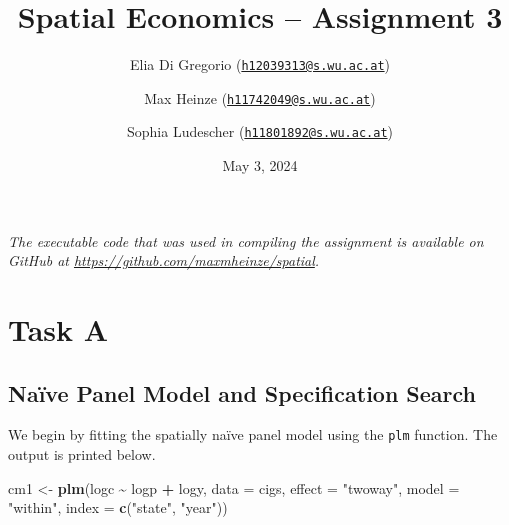 \documentclass[
  a4paper,
]{article}
\title{\textbf{Spatial Economics -- Assignment 3}}
\author{Elia Di Gregorio
(\href{mailto:h12039313@s.wu.ac.at}{\nolinkurl{h12039313@s.wu.ac.at}}) \and Max
Heinze
(\href{mailto:h11742049@s.wu.ac.at}{\nolinkurl{h11742049@s.wu.ac.at}}) \and Sophia
Ludescher
(\href{mailto:h11801892@s.wu.ac.at}{\nolinkurl{h11801892@s.wu.ac.at}})}
\date{May 3, 2024}
\newenvironment{Shaded}{\begin{snugshade}}{\end{snugshade}}
\newcommand{\AttributeTok}[1]{\textcolor[rgb]{0.13,0.29,0.53}{#1}}
\newcommand{\FunctionTok}[1]{\textcolor[rgb]{0.13,0.29,0.53}{\textbf{#1}}}
\newcommand{\NormalTok}[1]{#1}
\newcommand{\OtherTok}[1]{\textcolor[rgb]{0.56,0.35,0.01}{#1}}
\newcommand{\SpecialCharTok}[1]{\textcolor[rgb]{0.81,0.36,0.00}{\textbf{#1}}}
\newcommand{\StringTok}[1]{\textcolor[rgb]{0.31,0.60,0.02}{#1}}
\begin{document}
\maketitle

{
\hypersetup{linkcolor=}
\setcounter{tocdepth}{2}
\tableofcontents
}
\vspace{2em}

\begin{tcolorbox}
\centering \itshape The executable code that was used in compiling the assignment is available on GitHub at \url{https://github.com/maxmheinze/spatial}.
\end{tcolorbox}

\newpage

\hypertarget{task-a}{%
\section{Task A}\label{task-a}}

\hypertarget{nauxefve-panel-model-and-specification-search}{%
\subsection{Naïve Panel Model and Specification
Search}\label{nauxefve-panel-model-and-specification-search}}

We begin by fitting the spatially naïve panel model using the
\texttt{plm} function. The output is printed below.

\begin{Shaded}
\begin{Highlighting}[]
\NormalTok{cm1 }\OtherTok{\textless{}{-}} \FunctionTok{plm}\NormalTok{(logc }\SpecialCharTok{\textasciitilde{}}\NormalTok{ logp }\SpecialCharTok{+}\NormalTok{ logy, }\AttributeTok{data =}\NormalTok{ cigs, }\AttributeTok{effect =} \StringTok{"twoway"}\NormalTok{, }\AttributeTok{model =} \StringTok{"within"}\NormalTok{,}
    \AttributeTok{index =} \FunctionTok{c}\NormalTok{(}\StringTok{"state"}\NormalTok{, }\StringTok{"year"}\NormalTok{))}
\end{Highlighting}
\end{Shaded}
\end{document}
